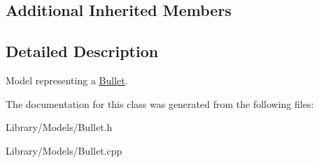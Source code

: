 \subsection*{Additional Inherited Members}


\subsection{Detailed Description}
Model representing a \hyperlink{classty_lib_1_1_bullet}{Bullet}. 

The documentation for this class was generated from the following files\+:\begin{DoxyCompactItemize}
\item 
Library/\+Models/Bullet.\+h\item 
Library/\+Models/Bullet.\+cpp\end{DoxyCompactItemize}
